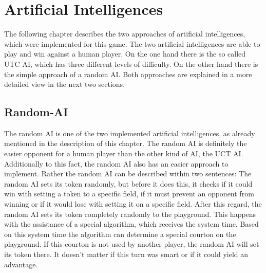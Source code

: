 \documentclass[english]{report} \usepackage[english]{babel}
\begin{document}
\chapter{Artificial Intelligences}
\label{sec:artificIntelligences}
The following chapter describes the two approaches of artificial intelligences,
which were implemented for this game. The two artificial intelligences are able
to play and win against a human player. On the one hand there is the so called
UTC AI, which has three different levels of difficulty. On the other hand
there is the simple approach of a random AI. Both approaches are explained in a
more detailed view in the next two sections.



\section{Random-AI}
The random AI is one of the two implemented artificial intelligences, as already
mentioned in the description of this chapter.
The random AI is definitely the easier opponent for a human player
than the other kind of AI, the UCT AI.
Additionally to this fact, the random AI also has an easier approach to
implement. Rather the random AI can be described within two sentences:
The random AI sets its token randomly, but before it does this, it checks if it
could win with setting a token to a specific field, if it must prevent an
opponent from winning or if it would lose with setting it on a specific field.
After this regard, the random AI sets its token completely
randomly to the playground. This happens with the assistance of a special
algorithm, which receives the system time. Based on this system time the
algorithm can determine a special courton on the playground. If this courton is
not used by another player, the random AI will set its token there. It doesn't
matter if this turn was smart or if it could yield an advantage.
\end{document}
